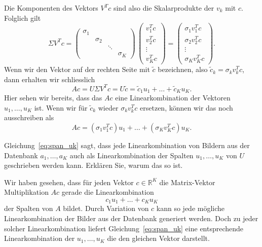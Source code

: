 Die Komponenten des Vektors $V^Tc$ sind also die Skalarprodukte der $v_k$ mit $c$.
Folglich gilt
\begin{equation*}
	\Sigma V^Tc=
	\begin{pmatrix}
		\sigma_1 & & & \\
		& \sigma_2 & & \\
		& & \ddots & \\
		& & & \sigma_K
	\end{pmatrix}\,
	\begin{pmatrix}
		v_1^T c \\
		v_2^T c \\
		\vdots \\
		v_K^T c
	\end{pmatrix}=
	\begin{pmatrix}
		\sigma_1 v_1^T c \\
		\sigma_2 v_2^T c \\
		\vdots \\
		\sigma_K v_K^T c
	\end{pmatrix}.
\end{equation*}
Wenn wir den Vektor auf der rechten Seite mit $\tilde c$ bezeichnen, also $\tilde c_k=\sigma_k v_k^T c$, dann erhalten wir schliesslich
\begin{equation*}
	Ac = U\Sigma V^Tc=U\tilde c
	=\tilde c_1 u_1+\ldots+\tilde c_K u_K.
\end{equation*}
Hier sehen wir bereits, dass das $Ac$ eine Linearkombination der Vektoren $u_1,\ldots,u_K$ ist.
Wenn wir für $\tilde c_k$ wieder $\sigma_k v_k^T c$ ersetzen, können wir das noch ausschreiben als
\begin{equation}\label{eq:span_uk}
	Ac =\left(\sigma_1 v_1^Tc\right) u_1+\ldots+\left(\sigma_K v_K^Tc\right) u_K.
\end{equation}
\begin{aufgabe}
	Gleichung~\eqref{eq:span_uk} sagt, dass jede Linearkombination von Bildern aus der Datenbank $a_1,\ldots,a_K$ auch als Linearkombination der Spalten $u_1,\ldots,u_K$ von $U$ geschrieben werden kann.
	Erklären Sie, warum das so ist.
\end{aufgabe}
\begin{losung*}
	Wir haben gesehen, dass für jeden Vektor $c\in\mathbb R^K$ die Matrix-Vektor Multiplikation $Ac$ gerade die Linearkombination
	\begin{equation*}
		c_1u_1+\ldots+c_Ku_K
	\end{equation*}
	der Spalten von $A$ bildet.
	Durch Variation von $c$ kann so jede mögliche Linearkombination der Bilder aus der Datenbank generiert werden.
	Doch zu jeder solcher Linearkombination liefert Gleichung~\eqref{eq:span_uk} eine entsprechende Linearkombination der $u_1,\ldots,u_K$ die den gleichen Vektor darstellt.
\end{losung*}
